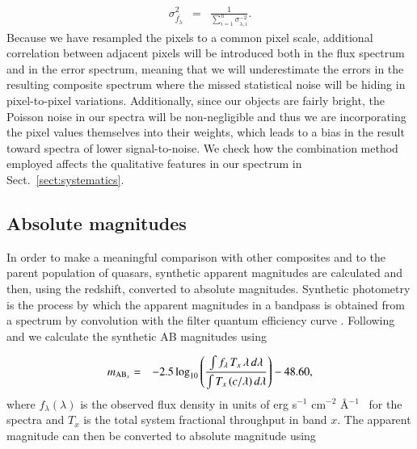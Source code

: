 \documentclass{aa}    %
\newcommand{\eqlabel}[1]{\label{eq:#1}}
\newcommand{\sectionname}{Sect.}
\newcommand{\Sect}[1]{\sectionname~\ref{sect:#1}}
\newcommand{\sect}[1]{\Sect{#1}}
\newcommand{\sectlabel}[1]{\label{sect:#1}}
\newcommand{\fluxunit}{erg s$^{-1}$ cm$^{-2}$ \AA$^{-1}$}
\begin{document}
\begin{eqnarray} \eqlabel{sigma-wmean}
\sigma_{\bar{f_{\lambda}}}^2 &=& \frac{ 1 }{\sum_{i=1}^n \sigma_{\lambda,
i}^{-2}}.
\end{eqnarray}
Because we have resampled the pixels to a common pixel scale, additional
correlation between adjacent pixels will be introduced both in the flux spectrum
and in the error spectrum, meaning that we will underestimate the errors in the
resulting composite spectrum where the missed statistical noise will be hiding
in pixel-to-pixel variations. Additionally, since our objects are fairly bright,
the Poisson noise in our spectra will be non-negligible and thus we are
incorporating the pixel values themselves into their weights, which leads to a
bias in the result toward spectra of lower signal-to-noise. We check how the
combination method employed affects the qualitative features in our spectrum in
\sect{systematics}.

\subsection{Absolute magnitudes} \sectlabel{absmag}

In order to make a meaningful comparison with other composites and to the parent
population of quasars, synthetic apparent magnitudes are calculated and then,
using the redshift, converted to absolute magnitudes. Synthetic photometry is
the process by which the apparent magnitudes in a bandpass is obtained from a
spectrum by convolution with the filter quantum efficiency curve
\citep{Bessell2005}. Following \citet{Bessell2012} and \citet{Casagrande2014} we
calculate the synthetic AB magnitudes using

\begin{eqnarray}\eqlabel{abmag}
m_{\textmd{AB}_x} &=& -2.5 \log_{10} \left(  \frac{\int f_\lambda \,  T_{x}  \,
\lambda \,  d\lambda} 
{\int  T_{x} \,  (c / \lambda) \,  d\lambda} \right) - 48.60,
\end{eqnarray}
where $f_\lambda (\lambda)$ is the observed flux density in units of \fluxunit~
for the spectra and $T_{x} $ is the total system
fractional throughput in band $x$. The apparent magnitude can then be converted
to absolute magnitude using
\end{document}
